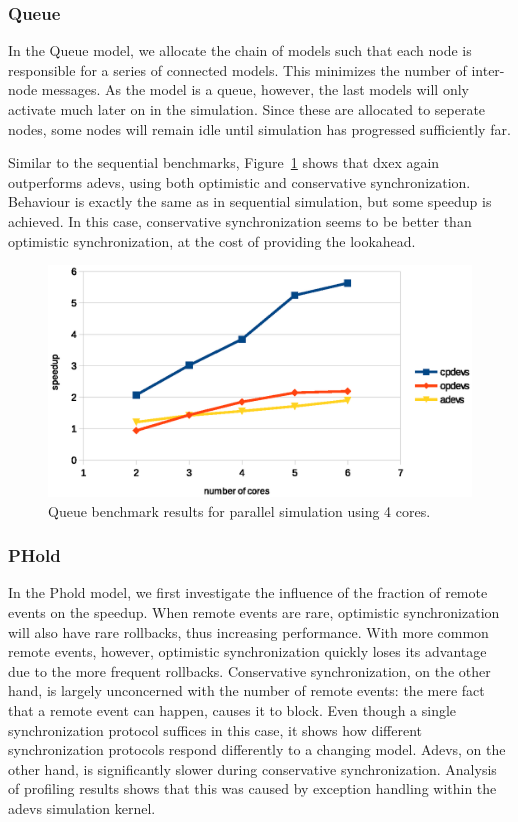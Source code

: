\subsubsection{Queue}
In the Queue model, we allocate the chain of models such that each node is responsible for a series of connected models.
This minimizes the number of inter-node messages.
As the model is a queue, however, the last models will only activate much later on in the simulation.
Since these are allocated to seperate nodes, some nodes will remain idle until simulation has progressed sufficiently far.

Similar to the sequential benchmarks, Figure~\ref{fig:queue_benchmark_parallel} shows that dxex again outperforms adevs, using both optimistic and conservative synchronization.
Behaviour is exactly the same as in sequential simulation, but some speedup is achieved.
In this case, conservative synchronization seems to be better than optimistic synchronization, at the cost of providing the lookahead.

\begin{figure}
	\includegraphics[width=\columnwidth]{fig/queue_parallel.eps}
	\caption{Queue benchmark results for parallel simulation using 4 cores.}
	\label{fig:queue_benchmark_parallel}
\end{figure}

\subsubsection{PHold}
In the Phold model, we first investigate the influence of the fraction of remote events on the speedup.
When remote events are rare, optimistic synchronization will also have rare rollbacks, thus increasing performance.
With more common remote events, however, optimistic synchronization quickly loses its advantage due to the more frequent rollbacks.
Conservative synchronization, on the other hand, is largely unconcerned with the number of remote events: the mere fact that a remote event can happen, causes it to block.
Even though a single synchronization protocol suffices in this case, it shows how different synchronization protocols respond differently to a changing model.
Adevs, on the other hand, is significantly slower during conservative synchronization.
Analysis of profiling results shows that this was caused by exception handling within the adevs simulation kernel.

